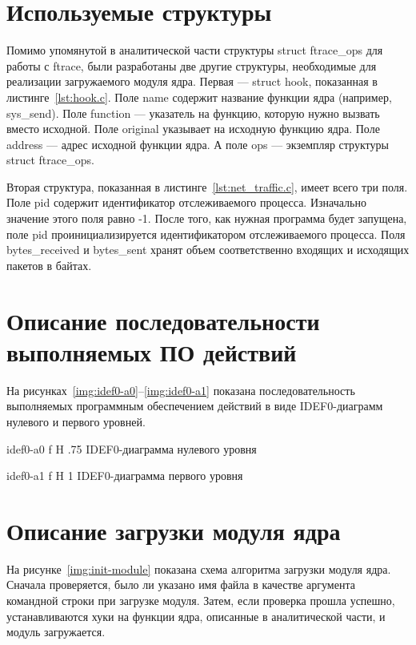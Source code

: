 \documentclass{bmstu}
\begin{document}
\section{Используемые структуры}

Помимо упомянутой в аналитической части структуры struct ftrace\_ops для работы с ftrace, были разработаны две другие структуры, необходимые для реализации загружаемого модуля ядра. 
Первая --- struct hook, показанная в листинге~\ref{lst:hook.c}. 
Поле name содержит название функции ядра (например, sys\_send). 
Поле function --- указатель на функцию, которую нужно вызвать вместо исходной. 
Поле original указывает на исходную функцию ядра. 
Поле address --- адрес исходной функции ядра. 
А поле ops --- экземпляр структуры struct ftrace\_ops.


Вторая структура, показанная в листинге~\ref{lst:net_traffic.c}, имеет всего три поля. 
Поле pid содержит идентификатор отслеживаемого процесса. 
Изначально значение этого поля равно -1. 
После того, как нужная программа будет запущена, поле pid проинициализируется идентификатором отслеживаемого процесса. 
Поля bytes\_received и bytes\_sent хранят объем соответственно входящих и исходящих пакетов в байтах.


\section{Описание последовательности выполняемых ПО действий}

На рисунках~\ref{img:idef0-a0}--\ref{img:idef0-a1} показана последовательность выполняемых программным обеспечением действий в виде IDEF0-диаграмм нулевого и первого уровней.

    {idef0-a0}
    {f}
    {H}
    {.75\textwidth}
    {IDEF0-диаграмма нулевого уровня}
    
    {idef0-a1}
    {f}
    {H}
    {1\textwidth}
    {IDEF0-диаграмма первого уровня}

\pagebreak 
\section{Описание загрузки модуля ядра}

На рисунке~\ref{img:init-module} показана схема алгоритма загрузки модуля ядра. 
Сначала проверяется, было ли указано имя файла в качестве аргумента командной строки при загрузке модуля. 
Затем, если проверка прошла успешно, устанавливаются хуки на функции ядра, описанные в аналитической части, и модуль загружается.
\end{document}
